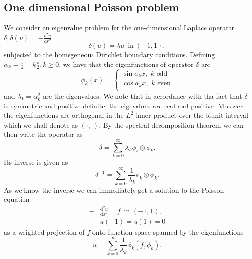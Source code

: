 \documentclass[a4paper,10pt]{article}
\newcommand{\inner}[2]{\ensuremath{\left(#1, #2\right)}}
\newcommand{\deriv}[2]{\ensuremath{\frac{\mathrm{d}#1}{\mathrm{d}#2}}}
\begin{document}
  \subsection{One dimensional Poisson problem}
  We consider an eigenvalue problem for the one-dimensional Laplace operator
  $\delta, \delta(u) = -\tfrac{d^2u}{dx^2}$
  \begin{equation}
  \label{eq:eig_pos1}
    \delta(u) = \lambda u \,\text{ in }(-1, 1),
  \end{equation}
  subjected to the homegeneous Dirichlet boundary conditions.
  Defining $\alpha_k = \frac{\pi}{2} + k\frac{\pi}{2}, k\geq0$, we have that the
  eigenfunctions of operator $\delta$ are
  \[
  \phi_k(x) = \begin{cases}
                \sin{\alpha_k x},\,\,k\,\,\text{odd}\\
                \cos{\alpha_k x},\,\,k\,\,\text{even}\\
              \end{cases}
  \]
  and $\lambda_k = \alpha_k^2$ are the eigenvalues. We note that in accordance
  with tha fact that $\delta$ is symmetric and positive definite, the eigevalues
  are real and positive. Morover the eigenfunctions are orthogonal in the $L^2$
  inner product over the biunit interval which we shall denote as
  $\inner{\cdot}{\cdot}$. By the spectral decomposition theorem
  we can then write the operator as
  \[
    \delta = \sum_{k=0}^{\infty} \lambda_k \phi_k \otimes \phi_k.
  \]
  Its inverse is given as
  \begin{equation}
    \label{eq:delta_inv}
    \delta^{-1} = \sum_{k=0}^{\infty} \frac{1}{\lambda_k} \phi_k \otimes \phi_k.
  \end{equation}
  As we know the inverse we can immediately get a solution to the Poisson
  equation
  \begin{equation}
  \label{eq:poisson_strong_1}
  \begin{aligned}
    -&\deriv{^2u}{x^2} = f\,\text{ in }(-1, 1),\\
     &u(-1) = u(1) = 0
  \end{aligned}
  \end{equation}
  as a weighted projection of $f$ onto function space spanned by the
  eigenfunctions
  \begin{equation}
  \label{eq:poisson_1d_sol}
  u = \sum_{k=0}^{\infty} \frac{1}{\lambda_k} \phi_k (f, \phi_k).
  \end{equation}
\end{document}
